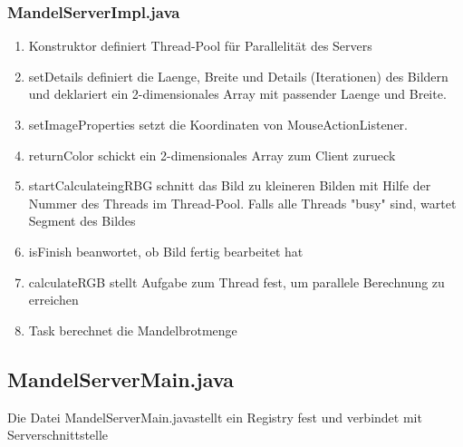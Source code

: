 \documentclass{article}
\begin{document}
	\subsubsection{MandelServerImpl.java}
	\begin{enumerate}
		\item Konstruktor definiert Thread-Pool für Parallelität des Servers
			
		\item setDetails definiert die Laenge, Breite und Details (Iterationen) des Bildern und deklariert ein 2-dimensionales Array mit passender Laenge und Breite.
			
		\item setImageProperties setzt die Koordinaten von MouseActionListener.
			
		\item returnColor schickt ein 2-dimensionales Array zum Client zurueck
			
		\newpage		
		\item startCalculateingRBG schnitt das Bild zu kleineren Bilden mit Hilfe der Nummer des Threads im Thread-Pool. Falls alle Threads "busy" sind, wartet Segment des Bildes 
			
		\item isFinish beanwortet, ob Bild fertig bearbeitet hat
			
		\item calculateRGB stellt Aufgabe zum Thread fest, um parallele Berechnung zu erreichen
			
		\newpage
		\item Task berechnet die Mandelbrotmenge
			
	\end{enumerate}
	
	\subsection{MandelServerMain.java}
	Die Datei \glqq MandelServerMain.java\grqq stellt ein Registry fest und verbindet mit Serverschnittstelle
	
	
\end{document}
